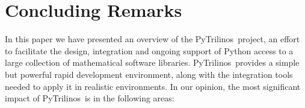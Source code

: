 \documentclass[acmtocl]{acmtrans2m}
\newcommand{\PyTrilinos}{{PyTrilinos}}
\begin{document}
%
\section{Concluding Remarks}
\label{sec:concluding}

In this paper we have presented an overview of the \PyTrilinos\
project, an effort to facilitate the design, integration and ongoing
support of Python access to a large collection of mathematical
software libraries. \PyTrilinos\ provides a simple but powerful
rapid development environment, along with the integration tools
needed to apply it in realistic environments. In our opinion, the
most significant impact of \PyTrilinos\ is in the following areas:
\end{document}
